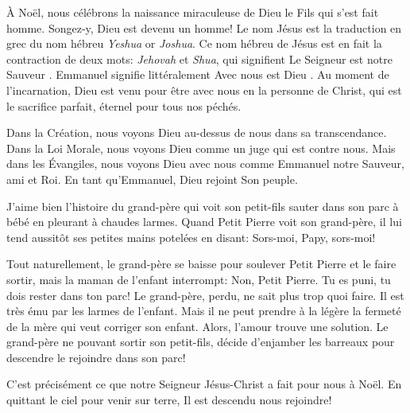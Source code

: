 


À Noël, nous célébrons la naissance miraculeuse de Dieu le Fils qui s'est fait homme. Songez-y, Dieu est devenu un homme! Le nom \og Jésus \fg{} est la traduction en grec du nom hébreu \emph{Yeshua} or \emph{Joshua}. Ce nom hébreu de Jésus est en fait la contraction de deux mots: \emph{Jehovah} et \emph{Shua}, qui signifient \og Le Seigneur est notre Sauveur \fg{}. Emmanuel signifie littéralement \og Avec nous est Dieu \fg{}. Au moment de l'incarnation, Dieu est venu pour être avec nous en la personne de Christ, qui est le sacrifice parfait, éternel pour tous nos péchés.

Dans la Création, nous voyons Dieu au-dessus de nous dans sa transcendance. Dans la Loi Morale, nous voyons Dieu comme un juge qui est contre nous. Mais dans les Évangiles, nous voyons Dieu avec nous comme Emmanuel \ocadr notre Sauveur, ami et Roi. En tant qu'Emmanuel, Dieu rejoint Son peuple.

J'aime bien l'histoire du grand-père qui voit son petit-fils sauter dans son parc à bébé en pleurant à chaudes larmes. Quand Petit Pierre voit son grand-père, il lui tend aussitôt ses petites mains potelées en disant: \og Sors-moi, Papy, sors-moi! \fg{}

Tout naturellement, le grand-père se baisse pour soulever Petit Pierre et le faire sortir, mais la maman de l'enfant interrompt: \og Non, Petit Pierre. Tu es puni, tu dois rester dans ton parc! \fg{} Le grand-père, perdu, ne sait plus trop quoi faire. Il est très ému par les larmes de l'enfant. Mais il ne peut prendre à la légère la fermeté de la mère qui veut corriger son enfant. Alors, l'amour trouve une solution. Le grand-père ne pouvant sortir son petit-fils, décide d'enjamber les barreaux pour descendre le rejoindre dans son parc!

C'est précisément ce que notre Seigneur Jésus-Christ a fait pour nous à Noël. En quittant le ciel pour venir sur terre, Il est descendu nous rejoindre!


